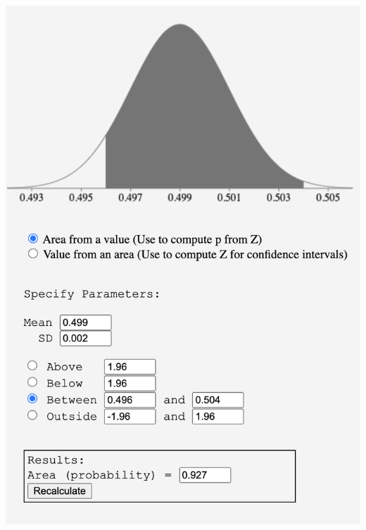 \documentclass[a4paper]{article}
\begin{document}
\begin{itemize}
    \includegraphics[scale=0.5]{Question-5.png}
\end{itemize}
  
\end{document}
